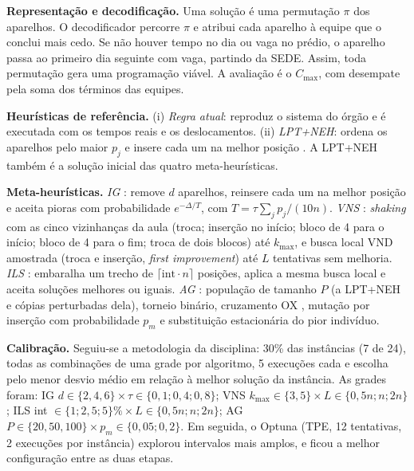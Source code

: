 \textbf{Representação e decodificação.} Uma solução é uma permutação $\pi$ dos aparelhos. O decodificador percorre $\pi$ e atribui cada aparelho à equipe que o conclui mais cedo. Se não houver tempo no dia ou vaga no prédio, o aparelho passa ao primeiro dia seguinte com vaga, partindo da SEDE. Assim, toda permutação gera uma programação viável. A avaliação é o $C_{\max}$, com desempate pela soma dos términos das equipes.

\textbf{Heurísticas de referência.} (i) \textit{Regra atual}: reproduz o sistema do órgão e é executada com os tempos reais e os deslocamentos. (ii) \textit{LPT+NEH}: ordena os aparelhos pelo maior $p_j$ e insere cada um na melhor posição \cite{nawaz1983heuristic}. A LPT+NEH também é a solução inicial das quatro meta-heurísticas.

\textbf{Meta-heurísticas.} \textit{IG} \cite{ruiz2007simple}: remove $d$ aparelhos, reinsere cada um na melhor posição e aceita pioras com probabilidade $e^{-\Delta/T}$, com $T=\tau\sum_jp_j/(10n)$. \textit{VNS} \cite{mladenovic1997variable}: \textit{shaking} com as cinco vizinhanças da aula (troca; inserção no início; bloco de 4 para o início; bloco de 4 para o fim; troca de dois blocos) até $k_{\max}$, e busca local VND amostrada (troca e inserção, \textit{first improvement}) até $L$ tentativas sem melhoria. \textit{ILS} \cite{lourenco2003iterated}: embaralha um trecho de $\lceil \text{int}\cdot n\rceil$ posições, aplica a mesma busca local e aceita soluções melhores ou iguais. \textit{AG} \cite{goldberg1989genetic}: população de tamanho $P$ (a LPT+NEH e cópias perturbadas dela), torneio binário, cruzamento OX \cite{davis1985applying}, mutação por inserção com probabilidade $p_m$ e substituição estacionária do pior indivíduo.

\textbf{Calibração.} Seguiu-se a metodologia da disciplina: 30\% das instâncias (7 de 24), todas as combinações de uma grade por algoritmo, 5 execuções cada e escolha pelo menor desvio médio em relação à melhor solução da instância. As grades foram: IG $d\in\{2,4,6\}\times\tau\in\{0{,}1;0{,}4;0{,}8\}$; VNS $k_{\max}\in\{3,5\}\times L\in\{0{,}5n;n;2n\}$; ILS int $\in\{1;2{,}5;5\}\%\times L\in\{0{,}5n;n;2n\}$; AG $P\in\{20,50,100\}\times p_m\in\{0{,}05;0{,}2\}$. Em seguida, o Optuna \cite{akiba2019optuna} (TPE, 12 tentativas, 2 execuções por instância) explorou intervalos mais amplos, e ficou a melhor configuração entre as duas etapas.

